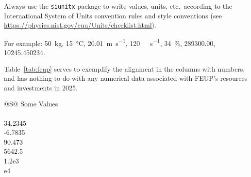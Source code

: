 Always use the \texttt{siunitx} package to write values, units, etc.\ 
according to the International System of Units convention rules and style conventions (see \url{https://physics.nist.gov/cuu/Units/checklist.html}).

For example:
\SI{50}{\kilo\gram}, 
\SI{15}{\celsius}, 
\SI{20,01}{\meter\per\second}, 
\SI{120}{\kilo\byte\per\second}, 
\SI{34}{\percent}, 
\SI{289300.00}{\eurocurrency}, 
\num{10245.450234}.

Table~\ref{tab:feup} %
serves to exemplify the alignment in the columns with numbers, and has nothing to do with any numerical data associated with \acs*{FEUP}'s resources and investments in 2025.

\begin{table}
  \centering
  \caption[Physical Resources of \acs*{FEUP}]{Physical Resources of \acs*{FEUP}~\parencite{kn:feup}.}
  \begin{tabular}{@{}S@{}}
    \toprule
    {Some Values} \\
     \\
    34.2345 \\
    -6.7835 \\
    90.473 \\
    5642.5 \\
    1.2e3 \\
    e4 \\
    \bottomrule
  \end{tabular}
  \label{tab:feup}
\end{table}


